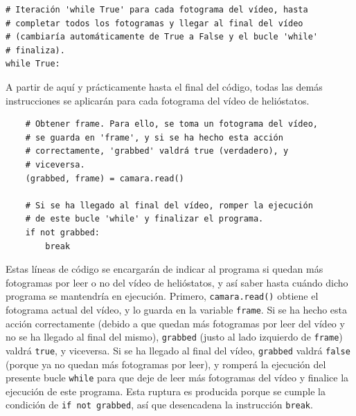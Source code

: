 \begin{lstlisting}
# Iteración 'while True' para cada fotograma del vídeo, hasta
# completar todos los fotogramas y llegar al final del vídeo
# (cambiaría automáticamente de True a False y el bucle 'while'
# finaliza).
while True:
\end{lstlisting}

A partir de aquí y prácticamente hasta el final del código, todas las demás instrucciones se aplicarán para cada fotograma del vídeo de helióstatos.\\[20pt]
    
\begin{lstlisting}
    # Obtener frame. Para ello, se toma un fotograma del vídeo,
    # se guarda en 'frame', y si se ha hecho esta acción
    # correctamente, 'grabbed' valdrá true (verdadero), y
    # viceversa.
    (grabbed, frame) = camara.read()

    # Si se ha llegado al final del vídeo, romper la ejecución
    # de este bucle 'while' y finalizar el programa.
    if not grabbed:
        break
\end{lstlisting}

Estas líneas de código se encargarán de indicar al programa si quedan más fotogramas por leer o no del vídeo de helióstatos, y así saber hasta cuándo dicho programa se mantendría en ejecución. Primero, \verb|camara.read()| obtiene el fotograma actual del vídeo, y lo guarda en la variable \verb|frame|. Si se ha hecho esta acción correctamente (debido a que quedan más fotogramas por leer del vídeo y no se ha llegado al final del mismo), \verb|grabbed| (justo al lado izquierdo de \verb|frame|) valdrá \verb|true|, y viceversa. Si se ha llegado al final del vídeo, \verb|grabbed| valdrá \verb|false| (porque ya no quedan más fotogramas por leer), y romperá la ejecución del presente bucle \verb|while| para que deje de leer más fotogramas del vídeo y finalice la ejecución de este programa. Esta ruptura es producida porque se cumple la condición de \verb|if not grabbed|, así que desencadena la instrucción \verb|break|.\\[20pt]

